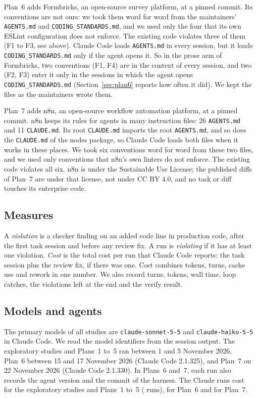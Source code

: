 \documentclass[pdflatex,sn-basic]{sn-jnl}
\newcommand{\file}[1]{\texttt{#1}}
\begin{document}
Plan~6 adds Formbricks, an open-source survey platform, at a pinned commit.
Its conventions are not ours: we took them word for word from the maintainers' \file{AGENTS.md} and \file{CODING\_STANDARDS.md}, and we used only the four that its own ESLint configuration does not enforce.
The existing code violates three of them (F1 to F3, see above).
Claude Code loads \file{AGENTS.md} in every session, but it loads \file{CODING\_STANDARDS.md} only if the agent opens it.
So in the prose arm of Formbricks, two conventions (F1, F4) are in the context of every session, and two (F2, F3) enter it only in the sessions in which the agent opens \file{CODING\_STANDARDS.md} (Section~\ref{sec:plan6} reports how often it did).
We kept the files as the maintainers wrote them.

Plan~7 adds n8n, an open-source workflow automation platform, at a pinned commit.
n8n keeps its rules for agents in many instruction files: 26 \file{AGENTS.md} and 11 \file{CLAUDE.md}.
Its root \file{CLAUDE.md} imports the root \file{AGENTS.md}, and so does the \file{CLAUDE.md} of the nodes package, so Claude Code loads both files when it works in these places.
We took six conventions word for word from these two files, and we used only conventions that n8n's own linters do not enforce.
The existing code violates all six.
n8n is under the Sustainable Use License; the published diffs of Plan~7 are under that license, not under CC BY 4.0, and no task or diff touches its enterprise code.

\subsection{Measures}

A \emph{violation} is a checker finding on an added code line in production code, after the first task session and before any review fix.
A run is \emph{violating} if it has at least one violation.
\emph{Cost} is the total cost per run that Claude Code reports: the task session plus the review fix, if there was one.
Cost combines tokens, turns, cache use and rework in one number.
We also record turns, tokens, wall time, loop catches, the violations left at the end and the verify result.

\subsection{Models and agents}

The primary models of all studies are \texttt{claude-sonnet-5-5} and \texttt{claude-haiku-5-5} in Claude Code.
We read the model identifiers from the session output.
The exploratory studies and Plans~1 to~5 ran between 1 and 5 November 2026, Plan~6 between 15 and 17 November 2026 (Claude Code 2.1.325), and Plan~7 on 22 November 2026 (Claude Code 2.1.330).
In Plans~6 and~7, each run also records the agent version and the commit of the harness.
The Claude runs cost \TotalCost{} for the exploratory studies and Plans~1 to~5 (\NClaudeRuns{} runs), \PSixCost{} for Plan~6 and \PSevenCost{} for Plan~7.
\end{document}

